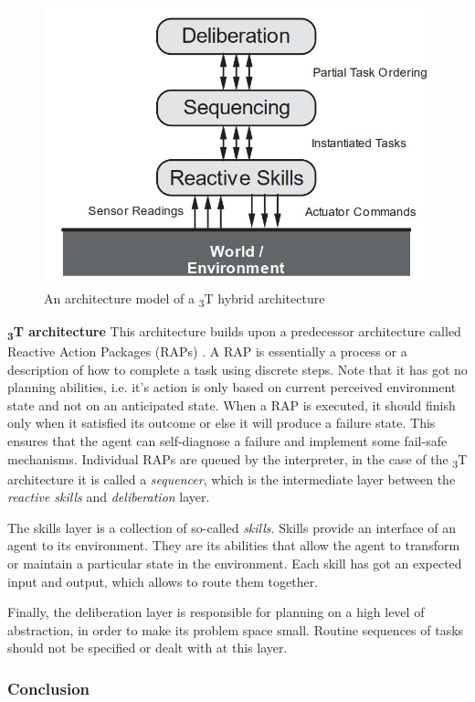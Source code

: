 \documentclass[main.tex]{subfiles}
\begin{document}
\begin{figure}[htbp]
    \centering
    \includegraphics[width=.6\textwidth]{3t-arch.jpg}
    \caption{An architecture model of a \textsubscript{3}T hybrid architecture \cite{Bonasso1995}}
    \label{3-arch}
\end{figure}

\textbf{\textsubscript{3}T architecture}\newline
This architecture builds upon a predecessor architecture called Reactive Action Packages (RAPs)
\cite{Firby1987}. A RAP is essentially a process or a description of how to complete a task using
discrete steps. Note that it has got no planning abilities, i.e. it's action is only based on
current perceived environment state and not on an anticipated state. When a RAP is executed, it
should finish only when it satisfied its outcome or else it will produce a failure state. This
ensures that the agent can self-diagnose a failure and implement some fail-safe mechanisms.
Individual RAPs are queued by the interpreter, in the case of the \textsubscript{3}T architecture it
is called a \emph{sequencer}, which is the intermediate layer between the \emph{reactive skills} and 
\emph{deliberation} layer.

The skills layer is a collection of so-called \emph{skills}. Skills provide an interface of an agent 
to its environment. They are its abilities that allow the agent to transform or maintain a particular 
state in the environment. Each skill has got an expected input and output, which allows to route them 
together. 

Finally, the deliberation layer is responsible for planning on a high level of abstraction, in 
order to make its problem space small. Routine sequences of tasks should not be specified or 
dealt with at this layer. 

\subsubsection{Conclusion}
\end{document}
